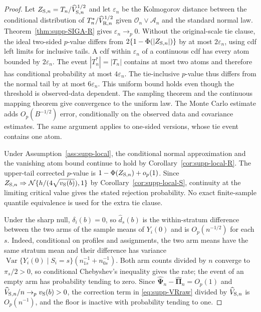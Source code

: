 \documentclass[12pt,a4paper]{article}
\theoremstyle{definition}
\theoremstyle{remark}\newtheorem{remark}{Remark}
\numberwithin{equation}{section}
\begin{document}
\begin{proof}
Let $Z_{{\rm S},n}=T_n/\widehat V_{{\rm S},n}^{1/2}$ and let $\varepsilon_n$ be the Kolmogorov distance between the conditional distribution of $T_n^*/\widehat V_{{\rm R},n}^{1/2}$ given $\mathcal O_n\vee\mathcal A_n$ and the standard normal law. Theorem~\ref{thm:supp-SIGA-R} gives $\varepsilon_n\to_p0$. Without the original-scale tie clause, the ideal two-sided $p$-value differs from $2\{1-\Phi(|Z_{{\rm S},n}|)\}$ by at most $2\varepsilon_n$, using cdf left limits for inclusive tails. A cdf within $\varepsilon_n$ of a continuous cdf has every atom bounded by $2\varepsilon_n$. The event $|T_n^*|=|T_n|$ contains at most two atoms and therefore has conditional probability at most $4\varepsilon_n$. The tie-inclusive $p$-value thus differs from the normal tail by at most $6\varepsilon_n$. This uniform bound holds even though the threshold is observed-data dependent. The sampling theorem and the continuous mapping theorem give convergence to the uniform law. The Monte Carlo estimate adds $O_p(B^{-1/2})$ error, conditionally on the observed data and covariance estimates. The same argument applies to one-sided versions, whose tie event contains one atom.

Under Assumption~\ref{ass:supp-local}, the conditional normal approximation and the vanishing atom bound continue to hold by Corollary~\ref{cor:supp-local-R}. The upper-tail corrected $p$-value is $1-\Phi(Z_{{\rm S},n})+o_p(1)$. Since $Z_{{\rm S},n}\Rightarrow\mathcal N\{h/(4\sqrt{v_{\rm S}(b)}),1\}$ by Corollary~\ref{cor:supp-local-S}, continuity at the limiting critical value gives the stated rejection probability. No exact finite-sample quantile equivalence is used for the extra tie clause.

Under the sharp null, $\delta_i(b)=0$, so $\widehat d_s(b)$ is the within-stratum difference between the two arms of the sample means of $Y_i(0)$ and is $O_p(n^{-1/2})$ for each $s$. Indeed, conditional on profiles and assignments, the two arm means have the same stratum mean and their difference has variance $\operatorname{Var}\{Y_i(0)\mid S_i=s\}(n_{1s}^{-1}+n_{0s}^{-1})$. Both arm counts divided by $n$ converge to $\pi_s/2>0$, so conditional Chebyshev's inequality gives the rate; the event of an empty arm has probability tending to zero. Since $\widehat{\bm\Psi}_n-\widehat{\bm\Pi}_n=O_p(1)$ and $\widehat V_{{\rm S},n}/n\to_pv_{\rm S}(b)>0$, the correction term in \eqref{eq:supp-VRraw} divided by $\widehat V_{{\rm S},n}$ is $O_p(n^{-1})$, and the floor is inactive with probability tending to one.
\end{proof}
\end{document}
